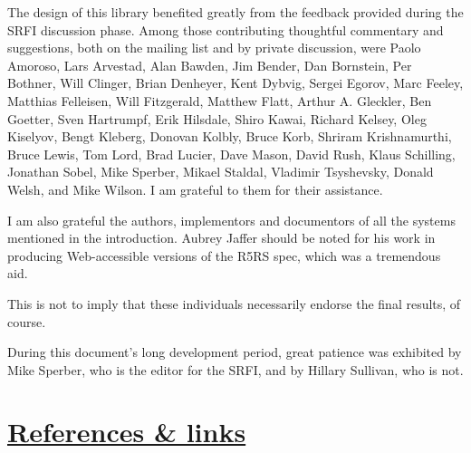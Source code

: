 The design of this library benefited greatly from the feedback provided
during the SRFI discussion phase. Among those contributing thoughtful
commentary and suggestions, both on the mailing list and by private
discussion, were Paolo Amoroso, Lars Arvestad, Alan Bawden, Jim Bender,
Dan Bornstein, Per Bothner, Will Clinger, Brian Denheyer, Kent Dybvig,
Sergei Egorov, Marc Feeley, Matthias Felleisen, Will Fitzgerald, Matthew
Flatt, Arthur A. Gleckler, Ben Goetter, Sven Hartrumpf, Erik Hilsdale,
Shiro Kawai, Richard Kelsey, Oleg Kiselyov, Bengt Kleberg, Donovan
Kolbly, Bruce Korb, Shriram Krishnamurthi, Bruce Lewis, Tom Lord, Brad
Lucier, Dave Mason, David Rush, Klaus Schilling, Jonathan Sobel, Mike
Sperber, Mikael Staldal, Vladimir Tsyshevsky, Donald Welsh, and Mike
Wilson. I am grateful to them for their assistance.

I am also grateful the authors, implementors and documentors of all the
systems mentioned in the introduction. Aubrey Jaffer should be noted for
his work in producing Web-accessible versions of the R5RS spec, which
was a tremendous aid.

This is not to imply that these individuals necessarily endorse the
final results, of course.

During this document's long development period, great patience was
exhibited by Mike Sperber, who is the editor for the SRFI, and by
Hillary Sullivan, who is not.

\section{\texorpdfstring{\href{}{References \&
links}}{References \& links}}\label{references-links}

